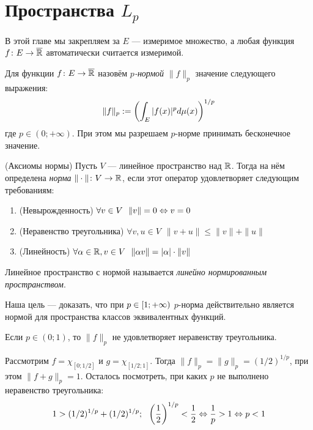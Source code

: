 \section{Пространства $L_p$}

\begin{note}
	В этой главе мы закрепляем за $E$ --- измеримое множество, а любая функция $f \colon E \to \overline{\mathbb{R}}$ автоматически считается измеримой.
\end{note}

\begin{definition}
	Для функции $f \colon E \to \overline{\mathbb{R}}$ назовём \textit{$p$-нормой} $\|f\|_p$ значение следующего выражения:
	\[
		\|f\|_p := \left(\int_E |f(x)|^pd\mu(x)\right)^{1/p}
	\]
	где $p \in (0; +\infty)$. При этом мы разрешаем $p$-норме принимать бесконечное значение.
\end{definition}

\begin{reminder} (Аксиомы нормы)
	Пусть $V$ --- линейное пространство над $\mathbb{R}$. Тогда на нём определена \textit{норма} $\|\cdot\| \colon V \to \mathbb{R}$, если этот оператор удовлетворяет следующим требованиям:
	\begin{enumerate}
		\item (Невырожденность) \(\forall v \in V\ \ \|v\| = 0 \Lra v = 0\)
		
		\item (Неравенство треугольника) \(\forall v, u \in V\ \ \|v + u\| \le \|v\| + \|u\|\)
		
		\item (Линейность) \(\forall \alpha \in \mathbb{R}, v \in V\ \ \|\alpha v\| = |\alpha| \cdot \|v\|\)
	\end{enumerate}
	Линейное пространство с нормой называется \textit{линейно нормированным пространством}.
\end{reminder}

\begin{note}
	Наша цель --- доказать, что при $p \in \left[1; +\infty\right)$ $p$-норма действительно является нормой для пространства классов эквивалентных функций.
\end{note}

\begin{note}
	Если $p \in (0; 1)$, то $\|f\|_p$ не удовлетворяет неравенству треугольника.
	
	Рассмотрим $f = \chi_{[0; 1/2]}$ и $g = \chi_{[1/2; 1]}$. Тогда $\|f\|_p = \|g\|_p = (1/2)^{1/p}$, при этом $\|f + g\|_p = 1$. Осталось посмотреть, при каких $p$ не выполнено неравенство треугольника:
	\[
		1 > (1/2)^{1/p} + (1/2)^{1/p};\ \ \left(\frac{1}{2}\right)^{1/p} < \frac{1}{2} \Leftrightarrow \frac{1}{p} > 1 \Leftrightarrow p < 1 
	\]
\end{note}

